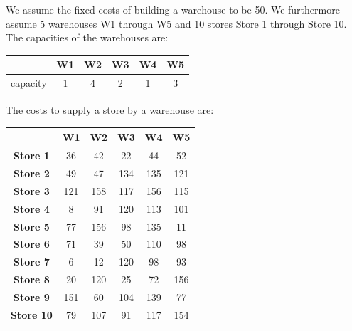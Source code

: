\documentclass[a4paper,halfparskip]{scrartcl}
\begin{document}
We assume the fixed costs of building a warehouse to be 50. We 
furthermore assume 5 warehouses W1 through W5 and 10 stores Store 1 
through Store 10. The capacities of the warehouses are:

\label{cap}
\begin{tabular}{||c|c|c|c|c|c||}
\hline
& \textbf{W1} & \textbf{W2} & \textbf{W3} & \textbf{W4} &\textbf{W5}\\
\hline
capacity  & 1 & 4 & 2 &1 & 3\\
\hline
\end{tabular}

The costs to supply a store by a warehouse are:

\begin{tabular}{||c|c|c|c|c|c||}
\hline
& \textbf{W1} & \textbf{W2} & \textbf{W3} & \textbf{W4} &\textbf{W5}\\
\hline
\textbf{Store 1}& 36 & 42 & 22 & 44 & 52\\
\hline
\textbf{Store 2}& 49 & 47 & 134 & 135 & 121\\ 
\hline
\textbf{Store 3}& 121 & 158 & 117 & 156 & 115\\
\hline
\textbf{Store 4}& 8 & 91 & 120 & 113 & 101\\
\hline
\textbf{Store 5}& 77 & 156 & 98 & 135 & 11\\
\hline
\textbf{Store 6}& 71 & 39 & 50 & 110 & 98\\
\hline
\textbf{Store 7}& 6 & 12 & 120 & 98 & 93\\
\hline
\textbf{Store 8}& 20 & 120 & 25 & 72 & 156\\
\hline
\textbf{Store 9}& 151 & 60 & 104 & 139 & 77\\
\hline
\textbf{Store 10}& 79 & 107 & 91 & 117 & 154\\
\hline
\end{tabular}
\end{document}
